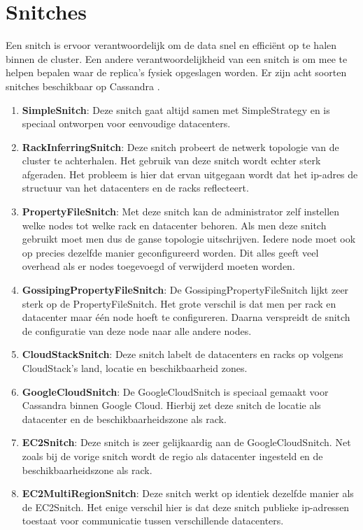 \section{Snitches}
\label{sec_snitch}
Een snitch is ervoor verantwoordelijk om de data snel en efficiënt op te halen binnen de cluster.
Een andere verantwoordelijkheid van een snitch is om mee te helpen bepalen waar de replica's fysiek opgeslagen worden.
Er zijn acht soorten snitches beschikbaar op Cassandra \citep{strickland2014availability}.

\begin{enumerate}
	\item \textbf{SimpleSnitch}:
	Deze snitch gaat altijd samen met SimpleStrategy en is speciaal ontworpen voor eenvoudige datacenters.
	
	\item \textbf{RackInferringSnitch}:
	Deze snitch probeert de netwerk topologie van de cluster te achterhalen.
	Het gebruik van deze snitch wordt echter sterk afgeraden.
	Het probleem is hier dat ervan uitgegaan wordt dat het ip-adres de structuur van het datacenters en de racks reflecteert.
	
	\item \textbf{PropertyFileSnitch}:
	Met deze snitch kan de administrator zelf instellen welke nodes tot welke rack en datacenter behoren.
	Als men deze snitch gebruikt moet men dus de ganse topologie uitschrijven. 
	Iedere node moet ook op precies dezelfde manier geconfigureerd worden.
	Dit alles geeft veel overhead als er nodes toegevoegd of verwijderd moeten worden.
	
	\item \textbf{GossipingPropertyFileSnitch}:
	De GossipingPropertyFileSnitch lijkt zeer sterk op de PropertyFileSnitch.
	Het grote verschil is dat men per rack en datacenter maar één node hoeft te configureren.
	Daarna verspreidt de snitch de configuratie van deze node naar alle andere nodes.
	
	\item \textbf{CloudStackSnitch}:
	Deze snitch labelt de datacenters en racks op volgens CloudStack's land, locatie en beschikbaarheid zones.
	
	\item \textbf{GoogleCloudSnitch}:
	De GoogleCloudSnitch is speciaal gemaakt voor Cassandra binnen Google Cloud.
	Hierbij zet deze snitch de locatie als datacenter en de beschikbaarheidszone als rack.
	
	\item \textbf{EC2Snitch}:
	Deze snitch is zeer gelijkaardig aan de GoogleCloudSnitch.
	Net zoals bij de vorige snitch wordt de regio als datacenter ingesteld en de beschikbaarheidszone als rack.
	
	\item \textbf{EC2MultiRegionSnitch}:
	Deze snitch werkt op identiek dezelfde manier als de EC2Snitch.
	Het enige verschil hier is dat deze snitch publieke ip-adressen toestaat voor communicatie tussen verschillende datacenters.
	
\end{enumerate}

